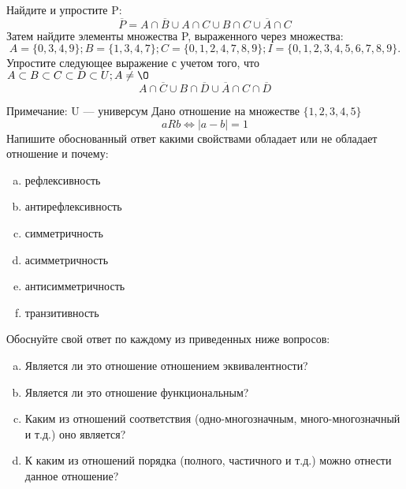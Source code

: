 \documentclass[10pt]{exam}
\begin{document}
\begin{questions}
\question
Найдите и упростите P:
\begin{equation*}
\overline{P} = A \cap \overline{B} \cup A \cap C \cup B \cap C \cup \overline{A} \cap C
\end{equation*}
Затем найдите элементы множества P, выраженного через множества:
\begin{equation*}
A = \{0, 3, 4, 9\}; 
B = \{1, 3, 4, 7\};
C = \{0, 1, 2, 4, 7, 8, 9\};
I = \{0, 1, 2, 3, 4, 5, 6, 7, 8, 9\}.
\end{equation*}\question
Упростите следующее выражение с учетом того, что $A\subset B \subset C \subset D \subset U; A \neq \O$
\begin{equation*}
A \cap  \overline{C} \cup B \cap \overline{D} \cup  \overline{A} \cap C \cap  \overline{D}
\end{equation*}

Примечание: U — универсум\question
Дано отношение на множестве $\{1, 2, 3, 4, 5\}$ 
\begin{equation*}
aRb \iff |a-b| = 1
\end{equation*}
Напишите обоснованный ответ какими свойствами обладает или не обладает отношение и почему:   
\begin{enumerate} [a)]\setcounter{enumi}{0}
\item рефлексивность
\item антирефлексивность
\item симметричность
\item асимметричность
\item антисимметричность
\item транзитивность
\end{enumerate}

Обоснуйте свой ответ по каждому из приведенных ниже вопросов:
\begin{enumerate} [a)]\setcounter{enumi}{0}
    \item Является ли это отношение отношением эквивалентности?
    \item Является ли это отношение функциональным?
    \item Каким из отношений соответствия (одно-многозначным, много-многозначный и т.д.) оно является?
    \item К каким из отношений порядка (полного, частичного и т.д.) можно отнести данное отношение?
\end{enumerate}


\end{questions}
\end{document}
